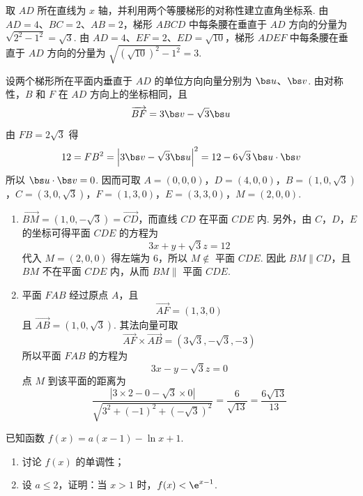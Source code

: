 \begin{solution}
取 \(AD\) 所在直线为 \(x\) 轴，并利用两个等腰梯形的对称性建立直角坐标系. 由 \(AD=4\)、\(BC=2\)、\(AB=2\)，梯形 \(ABCD\) 中每条腰在垂直于 \(AD\) 方向的分量为 \(\sqrt{2^2-1^2}=\sqrt3\). 由 \(AD=4\)、\(EF=2\)、\(ED=\sqrt{10}\)，梯形 \(ADEF\) 中每条腰在垂直于 \(AD\) 方向的分量为 \(\sqrt{(\sqrt{10})^2-1^2}=3\).

设两个梯形所在平面内垂直于 \(AD\) 的单位方向向量分别为 \(\bs u\)、\(\bs v\). 由对称性，\(B\) 和 \(F\) 在 \(AD\) 方向上的坐标相同，且
\[
\overrightarrow{BF}=3\bs v-\sqrt3\bs u
\]
由 \(FB=2\sqrt3\) 得
\[
12=FB^2=\left|3\bs v-\sqrt3\bs u\right|^2=12-6\sqrt3\,\bs u\cdot\bs v
\]
所以 \(\bs u\cdot\bs v=0\). 因而可取
\(A=(0,0,0)\)，\(D=(4,0,0)\)，\(B=(1,0,\sqrt3)\)，\(C=(3,0,\sqrt3)\)，\(F=(1,3,0)\)，\(E=(3,3,0)\)，\(M=(2,0,0)\).

\begin{enumerate}
\item \(\overrightarrow{BM}=(1,0,-\sqrt3)=\overrightarrow{CD}\)，而直线 \(CD\) 在平面 \(CDE\) 内. 另外，由 \(C\)，\(D\)，\(E\) 的坐标可得平面 \(CDE\) 的方程为
\[
3x+y+\sqrt3z=12
\]
代入 \(M=(2,0,0)\) 得左端为 \(6\)，所以 \(M\notin\) 平面 \(CDE\). 因此 \(BM\parallel CD\)，且 \(BM\) 不在平面 \(CDE\) 内，从而 \(BM\parallel\) 平面 \(CDE\).
\item 平面 \(FAB\) 经过原点 \(A\)，且
\[
\overrightarrow{AF}=(1,3,0)
\]
且 \(\overrightarrow{AB}=(1,0,\sqrt3)\).
其法向量可取
\[
\overrightarrow{AF}\times\overrightarrow{AB}=(3\sqrt3,-\sqrt3,-3)
\]
所以平面 \(FAB\) 的方程为
\[
3x-y-\sqrt3z=0
\]
点 \(M\) 到该平面的距离为
\[
\frac{|3\times2-0-\sqrt3\times0|}{\sqrt{3^2+(-1)^2+(-\sqrt3)^2}}=\frac6{\sqrt{13}}=\frac{6\sqrt{13}}{13}
\]
\end{enumerate}
\end{solution}

\begin{problem}
已知函数 \(f(x)=a(x-1)-\ln x+1\).
\begin{enumerate}
\item 讨论 \(f(x)\) 的单调性；
\item 设 \(a\le2\)，证明：当 \(x>1\) 时，\(f(x)<\e^{x-1}\).
\end{enumerate}
\end{problem}

